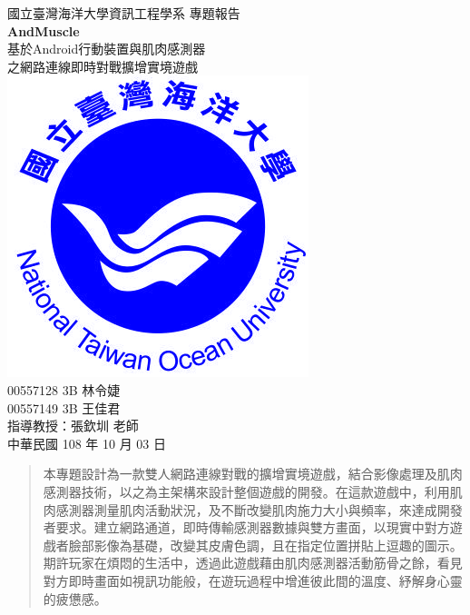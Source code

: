\documentclass[12pt]{article}  %
\theoremstyle{plain}
\begin{document}
\begin{titlepage}  %
\begin{center}
\Large 國立臺灣海洋大學資訊工程學系 專題報告\\
\vspace*{10ex}
\Huge \textbf{AndMuscle}\\
\LARGE 基於Android行動裝置與肌肉感測器\\
\LARGE 之網路連線即時對戰擴增實境遊戲\\
\vspace*{8ex}
\includegraphics[scale=1.0]{ntoulogo.jpg}\\
\vspace*{5ex}
\Large 00557128 3B 林令婕\\
\Large 00557149 3B 王佳君\\
\vspace*{2ex}
\Large 指導教授：張欽圳 老師\\
\vspace*{10ex}
\Large 中華民國 108 年 10 月 03 日
\end{center}
\end{titlepage}

\begin{abstract}  %
本專題設計為一款雙人網路連線對戰的擴增實境遊戲，結合影像處理及肌肉感測器技術，以之為主架構來設計整個遊戲的開發。在這款遊戲中，利用肌肉感測器測量肌肉活動狀況，及不斷改變肌肉施力大小與頻率，來達成開發者要求。建立網路通道，即時傳輸感測器數據與雙方畫面，以現實中對方遊戲者臉部影像為基礎，改變其皮膚色調，且在指定位置拼貼上逗趣的圖示。期許玩家在煩悶的生活中，透過此遊戲藉由肌肉感測器活動筋骨之餘，看見對方即時畫面如視訊功能般，在遊玩過程中增進彼此間的溫度、紓解身心靈的疲憊感。

\end{abstract}
\newpage  %
\end{document}
